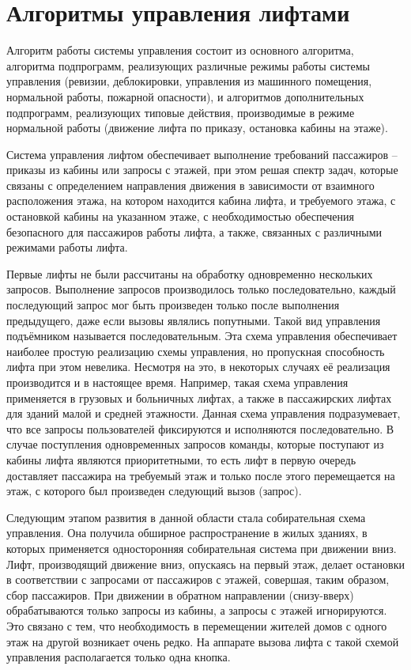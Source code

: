 \section{Алгоритмы управления лифтами}

	Алгоритм работы системы управления состоит из основного алгоритма, алгоритма подпрограмм,
		реализующих различные режимы работы системы управления (ревизии, деблокировки,
		управления из машинного помещения, нормальной работы, пожарной опасности),
		и алгоритмов дополнительных подпрограмм, реализующих типовые действия,
		производимые в режиме нормальной работы (движение лифта по приказу, остановка кабины на этаже).

	Система управления лифтом обеспечивает выполнение требований пассажиров
		-- приказы из кабины или запросы с этажей, при этом решая спектр задач,
		которые связаны с определением направления движения в зависимости от взаимного расположения этажа,
		на котором находится кабина лифта, и требуемого этажа, с остановкой кабины на указанном этаже,
		с необходимостью обеспечения безопасного для пассажиров работы лифта,
		а также, связанных с различными режимами работы лифта.

	Первые лифты не были рассчитаны на обработку одновременно нескольких запросов.
		Выполнение запросов производилось только последовательно, каждый последующий запрос
		мог быть произведен только после выполнения предыдущего, даже если вызовы являлись попутными.
		Такой вид управления подъёмником называется последовательным.
		Эта схема управления обеспечивает наиболее простую реализацию схемы управления,
		но пропускная способность лифта при этом невелика. Несмотря на это,
		в некоторых случаях её реализация производится и в настоящее время.
		Например, такая схема управления применяется в грузовых и больничных лифтах,
		а также в пассажирских лифтах для зданий малой и средней этажности.
		Данная схема управления подразумевает, что все запросы пользователей
		фиксируются и исполняются последовательно. В случае поступления одновременных
		запросов команды, которые поступают из кабины лифта являются приоритетными,
		то есть лифт в первую очередь доставляет пассажира на требуемый этаж и только
		после этого перемещается на этаж, с которого был произведен следующий вызов (запрос).

	Следующим этапом развития в данной области стала собирательная схема управления.
		Она получила обширное распространение в жилых зданиях, в которых применяется
		односторонняя собирательная система при движении вниз. Лифт, производящий движение вниз,
		опускаясь на первый этаж, делает остановки в соответствии с запросами от пассажиров с этажей,
		совершая, таким образом, сбор пассажиров. При движении в обратном направлении (снизу-вверх)
		обрабатываются только запросы из кабины, а запросы с этажей игнорируются. Это связано с тем,
		что необходимость в перемещении жителей домов с одного этаж на другой возникает очень редко.
		На аппарате вызова лифта с такой схемой управления располагается только одна кнопка.

